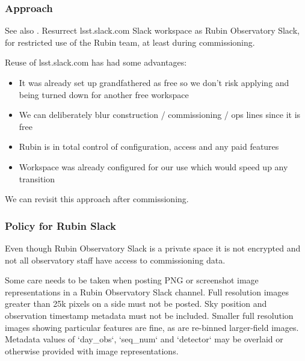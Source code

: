 \subsubsection{Approach}
See also .
Resurrect lsst.slack.com Slack workspace as Rubin Observatory Slack, for restricted use of the Rubin team, at least during commissioning.

Reuse of lsst.slack.com has had some advantages:

\begin{itemize}
\item  It was already set up grandfathered as free so we don't risk applying and being turned down for another free workspace
\item  We can deliberately blur construction / commissioning / ops lines since it is free
\item  Rubin is in total control of configuration, access and any paid features
\item  Workspace was already configured for our use which would speed up any transition

\end{itemize}
We can revisit this approach after commissioning.

\subsubsection{Policy for Rubin Slack}

Even though Rubin Observatory Slack is a private space it is not encrypted and not all observatory staff have access to commissioning data.

Some care needs to be taken when posting PNG or screenshot image representations in a Rubin Observatory Slack channel. 
Full resolution images greater than 25k pixels on a side must not be posted.
Sky position and observation timestamp metadata must not be included. 
Smaller full resolution images showing particular features are fine, as are re-binned larger-field images. 
Metadata values of `day_obs`, `seq_num` and `detector` may be overlaid or otherwise provided with image representations.
